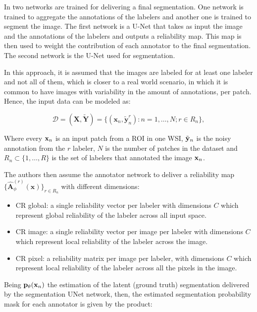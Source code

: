 In \cite{LopezEtAl2024} two networks are trained for delivering a final
segmentation. One network is trained to aggregate the annotations of
the labelers and another one is trained to segment the image. The
first network is a U-Net that takes as input the image and the
annotations of the labelers and outputs a reliability map. This map
is then used to weight the contribution of each annotator to the
final segmentation. The second network is the U-Net used for segmentation.

In this approach, it is assumed that the images are labeled for at least one
labeler and not all of them, which is closer to a real world scenario, in which
it is common to have images with variability in the amount of
annotations, per patch. Hence, the input data can be modeled as:

\begin{equation}
  \label{eq:input_data}
  \mathcal{D} = (\mathbf{X}, \tilde{\mathbf{Y}}) = \{ (\mathbf{x}_n,
  \tilde{\mathbf{y}}_n^r) : n = 1, \dots, N; r \in R_n \},
\end{equation}

Where every $\mathbf{x}_n$ is an input patch from a ROI in one \gls{WSI},
$\tilde{\mathbf{y}}_n$ is the noisy annotation from the $r$ labeler, $N$
is the number of patches in the dataset and $R_n \subset \{1, \dots,
R\}$ is the set of labelers that annotated the image $\mathbf{x}_n$.

The authors then assume the annotator network to deliver a
reliability map $\{\hat{\mathbf{A}}^{(r)}_{\phi}(\mathbf{x}) \}_{r
\in R_n}$ with different dimensions:

\begin{itemize}
  \item CR global: a single reliability vector per labeler with
    dimensions $C$ which represent global reliability of the labeler
    across all input space.
  \item CR image: a single reliability vector per image per labeler
    with dimensions $C$ which represent local reliability of the labeler
    across the image.
  \item CR pixel: a reliability matrix per image per labeler,
    with dimensions $C$ which represent local reliability of the labeler
    across all the pixels in the image.
\end{itemize}

Being $\mathbf{p}_\theta(\mathbf{x}_n)$ the estimation of the latent (ground
truth) segmentation delivered by the segmentation UNet network, then,
the estimated segmentation probability mask for each annotator is
given by the product:

